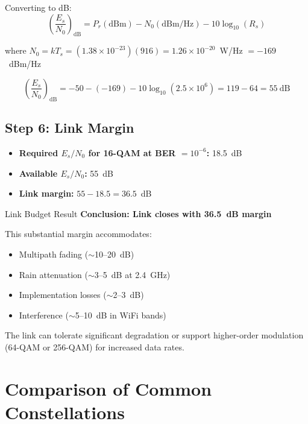 Converting to dB:
\begin{equation}
\left(\frac{E_s}{N_0}\right)_{\text{dB}} = P_r(\text{dBm}) - N_0(\text{dBm/Hz}) - 10\log_{10}(R_s)
\end{equation}

where $N_0 = kT_s = (1.38 \times 10^{-23})(916) = 1.26 \times 10^{-20}$~W/Hz $= -169$~dBm/Hz

\begin{equation}
\left(\frac{E_s}{N_0}\right)_{\text{dB}} = -50 - (-169) - 10\log_{10}(2.5 \times 10^6) = 119 - 64 = 55~\text{dB}
\end{equation}

\subsection*{Step 6: Link Margin}

\begin{itemize}
\item \textbf{Required $E_s/N_0$ for 16-QAM at BER $= 10^{-6}$:} 18.5~dB
\item \textbf{Available $E_s/N_0$:} 55~dB
\item \textbf{Link margin:} $55 - 18.5 = 36.5$~dB
\end{itemize}

\begin{calloutbox}[colback=black!8!white,colframe=black]{Link Budget Result}
\textbf{Conclusion: Link closes with 36.5~dB margin}

This substantial margin accommodates:
\begin{itemize}
\item Multipath fading ($\sim$10--20~dB)
\item Rain attenuation ($\sim$3--5~dB at 2.4~GHz)
\item Implementation losses ($\sim$2--3~dB)
\item Interference ($\sim$5--10~dB in WiFi bands)
\end{itemize}

The link can tolerate significant degradation or support higher-order modulation (64-QAM or 256-QAM) for increased data rates.
\end{calloutbox}

\section{Comparison of Common Constellations}

